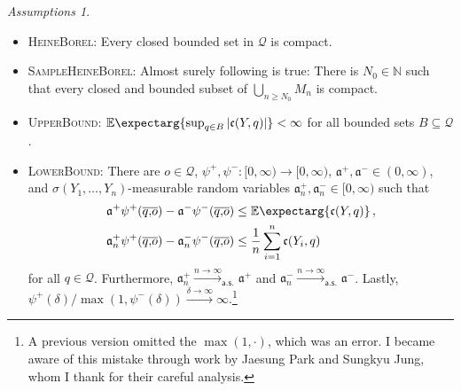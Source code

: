 \documentclass{scrartcl}
\renewcommand{\subset}{\subseteq}
\newcommand{\Ex}{\E\expectarg}
\newcommand*{\mc}[1]{\mathcal{#1}}
\newcommand*{\ms}[1]{\mathsf{#1}}
\newcommand*{\mf}[1]{\mathfrak{#1}}
\newcommand{\N}{\mathbb{N}}
\newcommand{\equationComma}{\, ,}
\newcommand{\eqcm}{\equationComma}
\theoremstyle{plain}\newtheorem{theorem}{Theorem}[section]
\theoremstyle{definition}
\theoremstyle{remark}
\newtheorem{assumptions}[theorem]{Assumptions}
\begin{document}
\begin{assumptions}\mbox{ }
\begin{itemize}
	\item \textsc{HeineBorel}: Every closed bounded set in $\mc Q$ is compact.
	\item \textsc{SampleHeineBorel}: Almost surely following is true: There is $N_0\in\N$ such that every closed and bounded subset of $\bigcup_{n\geq N_0} M_n$ is compact.
	\item \textsc{UpperBound}: $\Ex{\sup_{q\in B} \abs{\mf c(Y,q)}} < \infty$ for all bounded sets $B\subset\mc Q$.
	\item \textsc{LowerBound}: There are $o\in\mc Q$, $\psi^+, \psi^- \colon [0,\infty) \to [0,\infty)$, $\mf a^+, \mf a^- \in(0,\infty)$, and $\sigma(Y_1, \dots, Y_n)$-measurable random variables $\mf a^+_n, \mf a^-_n \in[0,\infty)$ such that 
	\begin{align*}
		\mf a^+ \psi^+(\ol qo) - \mf a^- \psi^-(\ol qo) &\leq \Ex{\mf c(Y, q)}
		\eqcm\\
		\mf a^+_n \psi^+(\ol qo) - \mf a^-_n \psi^-(\ol qo) &\leq \frac1n \sum_{i=1}^n \mf c(Y_i, q)
	\end{align*}
	for all $q\in\mc Q$. Furthermore, $\mf a^+_n\xrightarrow{n\to\infty}_{\ms{a.s.}}\mf a^+$ and $\mf a^-_n\xrightarrow{n\to\infty}_{\ms{a.s.}}\mf a^-$. Lastly, $\psi^+(\delta)/\max(1, \psi^-(\delta))\xrightarrow{\delta\to\infty}\infty$.\footnote{A previous version omitted the $\max(1,\cdot)$, which was an error. I became aware of this mistake through work by Jaesung Park and Sungkyu Jung, whom I thank for their careful analysis.}
	\end{itemize}
\end{assumptions}
\end{document}
